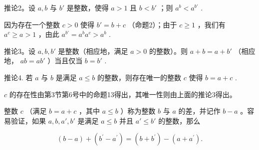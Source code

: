 推论2。设 \(a, b\) 与 \(b'\) 是整数，使得 \(a > 1\) 且 \(b < b'\) ；则 \(a^b < a^{b'}\) .

因为存在一个整数 \(c > 0\) 使得 \(b' = b + c\) （命题2）；由于 \(c \geqslant 1\) ，我们有 \(a^c \geqslant a > 1\) ，由此 \(a^{b'} = a^b a^c > a^b\) .

推论3。设 \(a, b, b'\) 是整数（相应地，满足 \(a > 0\) 的整数）。则 \(a + b = a + b'\) （相应地， \(ab = ab'\) ）当且仅当 \(b = b'\) .

推论4. 若 \(a\) 与 \(b\) 是满足 \(a \leqslant b\) 的整数，则存在唯一的整数 \(c\) 使得 \(b = a + c\) .

\(c\) 的存在性由第3节第6号中的命题13得出，其唯一性则由上面的推论3得出。

整数 \(c\) （满足 \(b = a + c\) ，其中 \(a \leqslant b\) ）称为整数 \(b\) 与 \(a\) 的差，并记作 \(b - a\) 。容易验证，如果 \(a, b, a', b'\) 是满足 \(a \leqslant b\) 并且 \(a' \leqslant b'\) 的整数，那么

\[
(b - a) + (b ^ {\prime} - a ^ {\prime}) = (b + b ^ {\prime}) - (a + a ^ {\prime}).
\]

